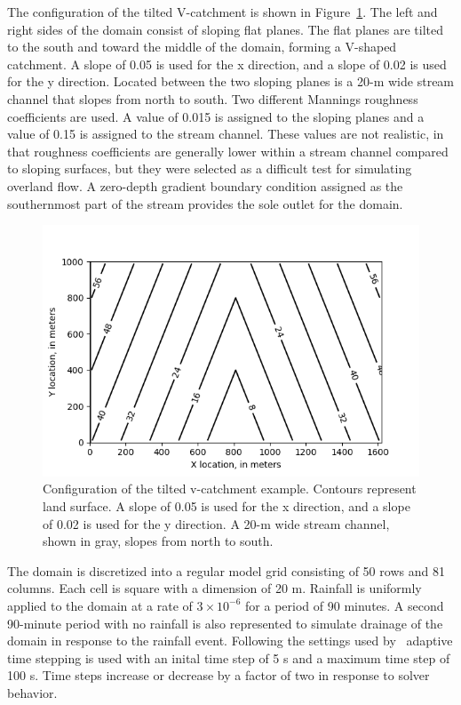 \documentclass[fleqn]{article}
\begin{document}
The configuration of the tilted V-catchment is shown in Figure~\ref{fig:vcatch-surface}.  The left and right sides of the domain consist of sloping flat planes.  The flat planes are tilted to the south and toward the middle of the domain, forming a V-shaped catchment.  A slope of 0.05 is used for the x direction, and a slope of 0.02 is used for the y direction.  Located between the two sloping planes is a 20-m wide stream channel that slopes from north to south.  Two different Mannings roughness coefficients are used.  A value of 0.015 is assigned to the sloping planes and a value of 0.15 is assigned to the stream channel.  These values are not realistic, in that roughness coefficients are generally lower within a stream channel compared to sloping surfaces, but they were selected as a difficult test for simulating overland flow.  A zero-depth gradient boundary condition assigned as the southernmost part of the stream provides the sole outlet for the domain.

\begin{figure}[h!tbp]
	\centering
	\includegraphics[scale=0.75]{figures/vcatch-surface.png}
	\caption[Configuration of the tilted v-catchment example.]{Configuration of the tilted v-catchment example.  Contours represent land surface.  A slope of 0.05 is used for the x direction, and a slope of 0.02 is used for the y direction.  A 20-m wide stream channel, shown in gray, slopes from north to south.}
	\label{fig:vcatch-surface}
\end{figure}

The domain is discretized into a regular model grid consisting of 50 rows and 81 columns.  Each cell is square with a dimension of 20 m.  Rainfall is uniformly applied to the domain at a rate of $3 \times 10^{-6}$ for a period of 90 minutes.  A second 90-minute period with no rainfall is also represented to simulate drainage of the domain in response to the rainfall event.  Following the settings used by~\cite{panday2004} adaptive time stepping is used with an inital time step of 5 s and a maximum time step of 100 s.  Time steps increase or decrease by a factor of two in response to solver behavior.
\end{document}
